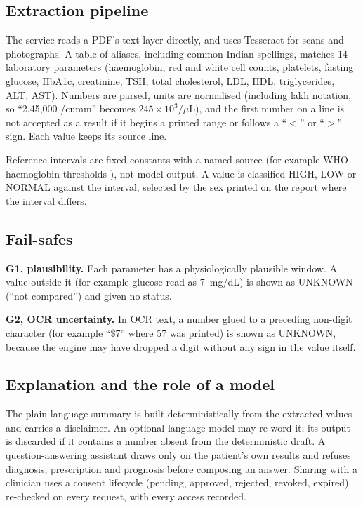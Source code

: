 \documentclass[10pt,twocolumn]{article}
\begin{document}
\subsection{Extraction pipeline}
The service reads a PDF's text layer directly, and uses Tesseract for scans and photographs. A table of aliases, including common Indian spellings, matches 14 laboratory parameters (haemoglobin, red and white cell counts, platelets, fasting glucose, HbA1c, creatinine, TSH, total cholesterol, LDL, HDL, triglycerides, ALT, AST). Numbers are parsed, units are normalised (including lakh notation, so ``2,45,000 /cumm'' becomes $245\times10^{3}/\mu$L), and the first number on a line is not accepted as a result if it begins a printed range or follows a ``$<$'' or ``$>$'' sign. Each value keeps its source line.

Reference intervals are fixed constants with a named source (for example WHO haemoglobin thresholds \cite{who}), not model output. A value is classified HIGH, LOW or NORMAL against the interval, selected by the sex printed on the report where the interval differs.

\subsection{Fail-safes}
\textbf{G1, plausibility.} Each parameter has a physiologically plausible window. A value outside it (for example glucose read as 7~mg/dL) is shown as UNKNOWN (``not compared'') and given no status.

\textbf{G2, OCR uncertainty.} In OCR text, a number glued to a preceding non-digit character (for example ``\$7'' where 57 was printed) is shown as UNKNOWN, because the engine may have dropped a digit without any sign in the value itself.

\subsection{Explanation and the role of a model}
The plain-language summary is built deterministically from the extracted values and carries a disclaimer. An optional language model may re-word it; its output is discarded if it contains a number absent from the deterministic draft. A question-answering assistant draws only on the patient's own results and refuses diagnosis, prescription and prognosis before composing an answer. Sharing with a clinician uses a consent lifecycle (pending, approved, rejected, revoked, expired) re-checked on every request, with every access recorded.
\end{document}
